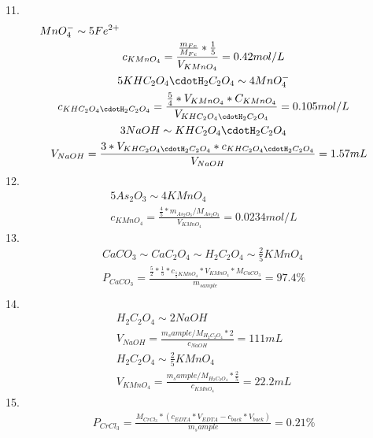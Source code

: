 \documentclass{article}
\begin{document}
11.\begin{equation}
    \begin{multlined}
        MnO_4^- \sim 5Fe^{2+}\\
        c_{KMnO_4} = \frac{\frac{m_{Fe}}{M_{Fe}} * \frac{1}{5}}{V_{KMnO_4}} = 0.42mol/L\\
        5KHC_2O_4\cdotH_2C_2O_4 \sim 4MnO_4^-\\
        c_{KHC_2O_4\cdotH_2C_2O_4} = \frac{\frac{5}{4}*V_{KMnO_4}*C_{KMnO_4}}{V_{KHC_2O_4\cdotH_2C_2O_4}} = 0.105mol/L\\
        3NaOH \sim KHC_2O_4\cdotH_2C_2O_4\\
        V_{NaOH} = \frac{3*V_{KHC_2O_4\cdotH_2C_2O_4} * c_{KHC_2O_4\cdotH_2C_2O_4}}{V_{NaOH}} = 1.57mL
    \end{multlined}
\end{equation}
12.\begin{equation}
    \begin{multlined}
        5As_2O_3 \sim 4KMnO_4\\
        c_{KMnO_4} = \frac{\frac{4}{5}*m_{As_2O_3}/M_{As_2O_3}}{V_{KMnO_4}} = 0.0234mol/L
    \end{multlined}
\end{equation}
13.\begin{equation}
    \begin{multlined}
        CaCO_3 \sim CaC_2O_4 \sim H_2C_2O_4 \sim \frac{2}{5}KMnO_4\\
        P_{CaCO_3} = \frac{\frac{5}{2}*\frac{1}{5}*c_{\frac{1}{5}KMnO_4}*V_{KMnO_4}*M_{CaCO_3}}{m_{sample}} = 97.4\%\\
    \end{multlined}
\end{equation}
14. \begin{equation}
    \begin{multlined}
        H_2C_2O_4 \sim 2NaOH\\
        V_{NaOH} = \frac{m_sample / M_{H_2C_2O_4}*2}{c_{NaOH}} = 111mL\\
        H_2C_2O_4 \sim \frac{2}{5}KMnO_4\\
        V_{KMnO_4} = \frac{m_sample / M_{H_2C_2O_4}*\frac{2}{5}}{c_{KMnO_4}} = 22.2mL
    \end{multlined}
\end{equation}
15.\begin{equation}
    \begin{multlined}
        P_{CrCl_3} = \frac{M_{CrCl_3}*\left(c_{EDTA}*V_{EDTA} - c_{back}*V_{back}\right)}{m_sample} = 0.21\%
    \end{multlined}
\end{equation}
\end{document}
